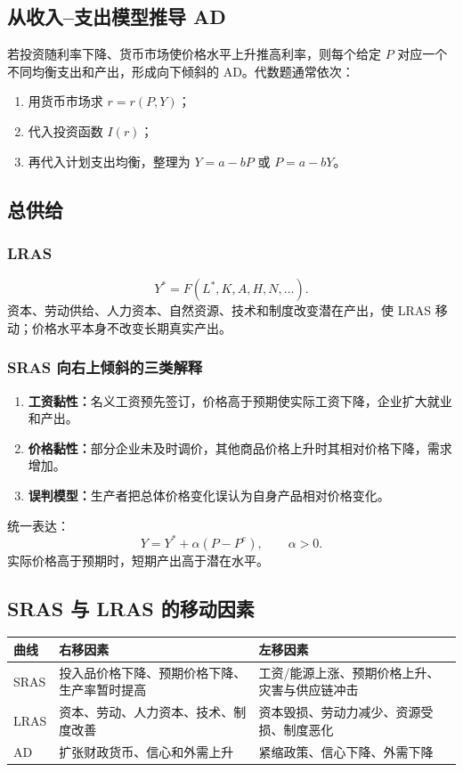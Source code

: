 \documentclass[UTF8,11pt,a4paper]{ctexart}
\newcommand{\term}[1]{\textbf{#1}}
\begin{document}
\subsection{从收入--支出模型推导 AD}
若投资随利率下降、货币市场使价格水平上升推高利率，则每个给定 $P$ 对应一个不同均衡支出和产出，形成向下倾斜的 AD。代数题通常依次：
\begin{enumerate}
  \item 用货币市场求 $r=r(P,Y)$；
  \item 代入投资函数 $I(r)$；
  \item 再代入计划支出均衡，整理为 $Y=a-bP$ 或 $P=a-bY$。
\end{enumerate}

\subsection{总供给}
\subsubsection{LRAS}
\[
Y^*=F(L^*,K,A,H,N,\ldots).
\]
资本、劳动供给、人力资本、自然资源、技术和制度改变潜在产出，使 LRAS 移动；价格水平本身不改变长期真实产出。

\subsubsection{SRAS 向右上倾斜的三类解释}
\begin{enumerate}
  \item \term{工资黏性：}名义工资预先签订，价格高于预期使实际工资下降，企业扩大就业和产出。
  \item \term{价格黏性：}部分企业未及时调价，其他商品价格上升时其相对价格下降，需求增加。
  \item \term{误判模型：}生产者把总体价格变化误认为自身产品相对价格变化。
\end{enumerate}
统一表达：
\[
Y=Y^*+\alpha(P-P^e),\qquad \alpha>0.
\]
实际价格高于预期时，短期产出高于潜在水平。

\subsection{SRAS 与 LRAS 的移动因素}
\begin{longtable}{p{}p{}p{}}
\toprule
曲线 & 右移因素 & 左移因素\\
\midrule
SRAS & 投入品价格下降、预期价格下降、生产率暂时提高 & 工资/能源上涨、预期价格上升、灾害与供应链冲击\\
LRAS & 资本、劳动、人力资本、技术、制度改善 & 资本毁损、劳动力减少、资源受损、制度恶化\\
AD & 扩张财政货币、信心和外需上升 & 紧缩政策、信心下降、外需下降\\
\bottomrule
\end{longtable}
\end{document}

